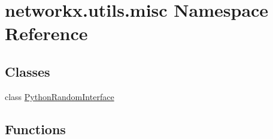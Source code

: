 \hypertarget{namespacenetworkx_1_1utils_1_1misc}{}\section{networkx.\+utils.\+misc Namespace Reference}
\label{namespacenetworkx_1_1utils_1_1misc}
\subsection*{Classes}
\begin{DoxyCompactItemize}
\item 
class \hyperlink{classnetworkx_1_1utils_1_1misc_1_1PythonRandomInterface}{Python\+Random\+Interface}
\end{DoxyCompactItemize}
\subsection*{Functions}
